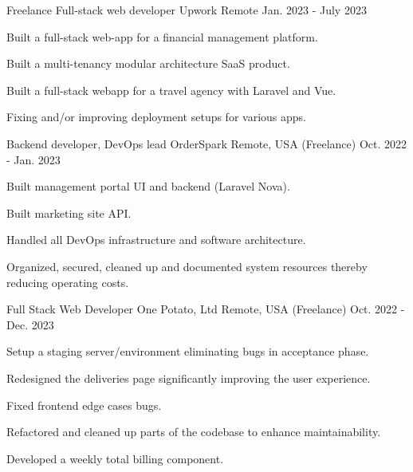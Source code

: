 \begin{cventries}
  \cventry
    {Freelance Full-stack web developer} %
    {Upwork} %
    {Remote} %
    {Jan. 2023 - July 2023} %
    {
      \begin{cvitems} %
        \item {Built a full-stack web-app for a financial management platform.}
        \item {Built a multi-tenancy modular architecture SaaS product.}
        \item {Built a full-stack webapp for a travel agency with Laravel and Vue.}
        \item {Fixing and/or improving deployment setups for various apps.}
      \end{cvitems}
    }

  \cventry
    {Backend developer, DevOps lead} %
    {OrderSpark} %
    {Remote, USA (Freelance)} %
    {Oct. 2022 - Jan. 2023} %
    {
      \begin{cvitems} %
        \item {Built management portal UI and backend (Laravel Nova).}
        \item {Built marketing site API.}
        \item {Handled all DevOps infrastructure and software architecture.}
        \item {Organized, secured, cleaned up and documented system resources thereby reducing operating costs.}
      \end{cvitems}
    }

  \cventry
    {Full Stack Web Developer} %
    {One Potato, Ltd} %
    {Remote, USA (Freelance)} %
    {Oct. 2022 - Dec. 2023} %
    {
      \begin{cvitems} %
        \item {Setup a staging server/environment eliminating bugs in acceptance phase.}
        \item {Redesigned the deliveries page significantly improving the user experience.}
        \item {Fixed frontend edge cases bugs.}
        \item {Refactored and cleaned up parts of the codebase to enhance maintainability.}
        \item {Developed a weekly total billing component.}
      \end{cvitems}
    }


\end{cventries}
